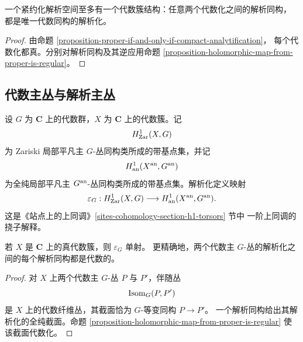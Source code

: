 \begin{proposition}[推论]
\label{corollary-compact-analytic-space-unique-algebraization}
\begin{reference}
\cite[\S 4，第 19 号，命题 15 的推论]{GAGA}
\end{reference}
一个紧约化解析空间至多有一个代数簇结构：任意两个代数化之间的解析同构，
都是唯一代数同构的解析化。
\end{proposition}

\begin{proof}
由命题 \ref{proposition-proper-if-and-only-if-compact-analytification}，
每个代数化都真。分别对解析同构及其逆应用命题
\ref{proposition-holomorphic-map-from-proper-is-regular}。
\end{proof}


\subsection{代数主丛与解析主丛}
\label{subsection-gaga-principal-bundles}

\begin{definition}
\label{definition-principal-bundle-analytification-map}
\begin{reference}
\cite[\S 4，第 20 号]{GAGA}
\end{reference}
设 $G$ 为 $\mathbf C$ 上的代数群，$X$ 为 $\mathbf C$ 上的代数簇。记
$$
H^1_{\rm Zar}(X,G)
$$
为 Zariski 局部平凡主 $G$-丛同构类所成的带基点集，并记
$$
H^1_{\rm an}(X^{\rm an},G^{\rm an})
$$
为全纯局部平凡主 $G^{\rm an}$-丛同构类所成的带基点集。解析化定义映射
$$
\varepsilon_G:H^1_{\rm Zar}(X,G)
\longrightarrow H^1_{\rm an}(X^{\rm an},G^{\rm an}).
$$
这是《站点上的上同调》\ref{sites-cohomology-section-h1-torsors} 节中
一阶上同调的挠子解释。
\end{definition}

\begin{proposition}
\label{proposition-principal-bundle-analytification-injective}
\begin{reference}
\cite[\S 4，第 20 号，命题 16]{GAGA}
\end{reference}
若 $X$ 是 $\mathbf C$ 上的真代数簇，则 $\varepsilon_G$ 单射。
更精确地，两个代数主 $G$-丛的解析化之间的每个解析同构都是代数的。
\end{proposition}

\begin{proof}
对 $X$ 上两个代数主 $G$-丛 $P$ 与 $P'$，伴随丛
$$
\mathop{\rm Isom}\nolimits_G(P,P')
$$
是 $X$ 上的代数纤维丛，其截面恰为 $G$-等变同构 $P\to P'$。
一个解析同构给出其解析化的全纯截面。命题
\ref{proposition-holomorphic-map-from-proper-is-regular} 使该截面代数化。
\end{proof}

